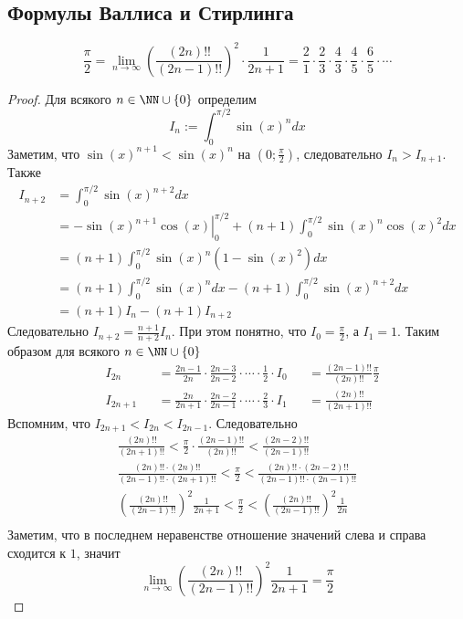 \documentclass[12pt,a4paper]{article}
\begin{document}
    \subsection{Формулы Валлиса и Стирлинга}

    \begin{theorem}
        \[
            \frac{\pi}{2}
            = \lim_{n \to \infty} \left(\frac{(2n)!!}{(2n-1)!!}\right)^2 \cdot \frac{1}{2n+1}
            = \frac{2}{1} \cdot \frac{2}{3} \cdot \frac{4}{3} \cdot \frac{4}{5} \cdot \frac{6}{5} \cdot \cdots
        \]
    \end{theorem}

    \begin{proof}
        Для всякого $n \in \NN \cup \{0\}$ определим
        \[I_n := \int_0^{\pi/2} \sin(x)^n dx\]
        Заметим, что $\sin(x)^{n+1} < \sin(x)^n$ на $(0; \frac{\pi}{2})$, следовательно $I_n > I_{n+1}$. Также
        \begin{align*}
            I_{n+2}
            &= \int_0^{\pi/2} \sin(x)^{n+2} dx\\
            &= \left. -\sin(x)^{n+1}\cos(x) \right|_0^{\pi/2} + (n+1)\int_0^{\pi/2} \sin(x)^n \cos(x)^2 dx\\
            &= (n+1)\int_0^{\pi/2} \sin(x)^n (1 - \sin(x)^2) dx\\
            &= (n+1)\int_0^{\pi/2} \sin(x)^n dx - (n+1)\int_0^{\pi/2} \sin(x)^{n+2} dx\\
            &= (n+1) I_n - (n+1) I_{n+2}
        \end{align*}
        Следовательно $I_{n+2} = \frac{n+1}{n+2} I_n$. При этом понятно, что $I_0 = \frac{\pi}{2}$, а $I_1 = 1$. Таким образом для всякого $n \in \NN \cup \{0\}$
        \begin{align*}
            &I_{2n}&
            &= \frac{2n-1}{2n} \cdot \frac{2n-3}{2n-2} \cdot \cdots \cdot \frac{1}{2} \cdot I_0&
            &= \frac{(2n-1)!!}{(2n)!!} \frac{\pi}{2}\\
            &I_{2n+1}&
            &= \frac{2n}{2n+1} \cdot \frac{2n-2}{2n-1} \cdot \cdots \cdot \frac{2}{3} \cdot I_1&
            &= \frac{(2n)!!}{(2n+1)!!}
        \end{align*}
        Вспомним, что $I_{2n+1} < I_{2n} < I_{2n-1}$. Следовательно
        \begin{gather*}
            \frac{(2n)!!}{(2n+1)!!} < \frac{\pi}{2} \cdot \frac{(2n-1)!!}{(2n)!!} < \frac{(2n-2)!!}{(2n-1)!!}\\
            \frac{(2n)!! \cdot (2n)!!}{(2n-1)!! \cdot (2n+1)!!} < \frac{\pi}{2} < \frac{(2n)!! \cdot (2n-2)!!}{(2n-1)!! \cdot (2n-1)!!}\\
            \left(\frac{(2n)!!}{(2n-1)!!}\right)^2 \frac{1}{2n+1} < \frac{\pi}{2} < \left(\frac{(2n)!!}{(2n-1)!!}\right)^2 \frac{1}{2n}\\
        \end{gather*}
        Заметим, что в последнем неравенстве отношение значений слева и справа сходится к $1$, значит
        \[\lim_{n \to \infty} \left(\frac{(2n)!!}{(2n-1)!!}\right)^2 \frac{1}{2n+1} = \frac{\pi}{2}\]
    \end{proof}
\end{document}

